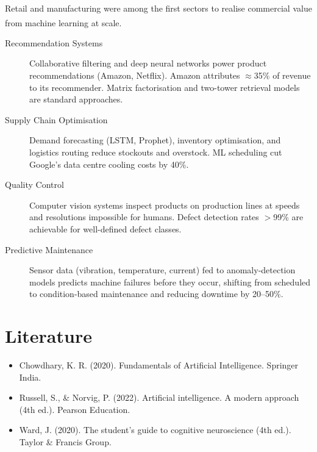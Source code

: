     \begin{tcbitemize}[ skin=sectionraster ]
        \tcbitem[title={AI in Retail and Industrial Operations}, raster multicolumn=6]
        Retail and manufacturing were among the first sectors to realise commercial value from machine learning at scale.\textsuperscript{\cite{adjaouteAI2024}}

        \begin{description}
            \item[Recommendation Systems] Collaborative filtering and deep neural networks power product recommendations (Amazon, Netflix). Amazon attributes $\approx$35\% of revenue to its recommender. Matrix factorisation and two-tower retrieval models are standard approaches.
            \item[Supply Chain Optimisation] Demand forecasting (LSTM, Prophet), inventory optimisation, and logistics routing reduce stockouts and overstock. ML scheduling cut Google's data centre cooling costs by 40\%.
            \item[Quality Control] Computer vision systems inspect products on production lines at speeds and resolutions impossible for humans. Defect detection rates $>$99\% are achievable for well-defined defect classes.
            \item[Predictive Maintenance] Sensor data (vibration, temperature, current) fed to anomaly-detection models predicts machine failures before they occur, shifting from scheduled to condition-based maintenance and reducing downtime by 20--50\%.
        \end{description}
    \end{tcbitemize}

    \section{Literature}
    \begin{itemize}
        \item Chowdhary, K. R. (2020). Fundamentals of Artificial Intelligence. Springer India.
        \item Russell, S., \& Norvig, P. (2022). Artificial intelligence. A modern approach (4th ed.). Pearson Education.
        \item Ward, J. (2020). The student's guide to cognitive neuroscience (4th ed.). Taylor \& Francis Group.
    \end{itemize}

